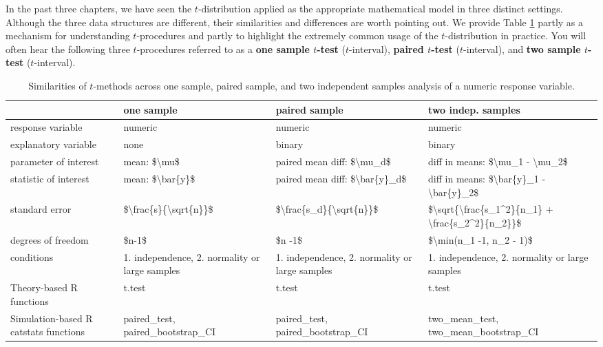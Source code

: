 \documentclass[
  10pt,
  openany]{book}
\theoremstyle{definition}
\theoremstyle{definition}
\theoremstyle{definition}
\theoremstyle{definition}
\theoremstyle{remark}
\begin{document}
In the past three chapters, we have seen the \(t\)-distribution applied as the appropriate mathematical model in three distinct settings. Although the three data structures are different, their similarities and differences are worth pointing out. We provide Table \ref{tab:tcompare} partly as a mechanism for understanding \(t\)-procedures and partly to highlight the extremely common usage of the \(t\)-distribution in practice. You will often hear the following three \(t\)-procedures referred to as a \textbf{one sample \(t\)-test} (\(t\)-interval), \textbf{paired \(t\)-test} (\(t\)-interval), and \textbf{two sample \(t\)-test} (\(t\)-interval).

\begin{table}
\centering
\caption{\label{tab:tcompare}Similarities of $t$-methods across one sample, paired sample, and two independent samples analysis of a numeric response variable.}
\centering
\begin{tabular}[t]{l|l|l|l}
\hline
 &  one sample  & paired sample & two indep. samples\\
\hline
response variable & numeric & numeric & numeric\\
\hline
explanatory variable & none & binary & binary\\
\hline
parameter of interest & mean: \$\textbackslash{}mu\$ & paired mean diff: \$\textbackslash{}mu\_d\$ & diff in means: \$\textbackslash{}mu\_1 - \textbackslash{}mu\_2\$\\
\hline
statistic of interest & mean: \$\textbackslash{}bar\{y\}\$ & paired mean diff: \$\textbackslash{}bar\{y\}\_d\$ & diff in means: \$\textbackslash{}bar\{y\}\_1 - \textbackslash{}bar\{y\}\_2\$\\
\hline
standard error & \$\textbackslash{}frac\{s\}\{\textbackslash{}sqrt\{n\}\}\$ & \$\textbackslash{}frac\{s\_d\}\{\textbackslash{}sqrt\{n\}\}\$ & \$\textbackslash{}sqrt\{\textbackslash{}frac\{s\_1\textasciicircum{}2\}\{n\_1\} + \textbackslash{}frac\{s\_2\textasciicircum{}2\}\{n\_2\}\}\$\\
\hline
degrees of freedom & \$n-1\$ & \$n -1\$ & \$\textbackslash{}min(n\_1 -1, n\_2 - 1)\$\\
\hline
conditions & 1. independence, 2. normality or large samples & 1. independence, 2. normality or large samples & 1. independence, 2. normality or large samples\\
\hline
Theory-based R functions & t.test & t.test & t.test\\
\hline
Simulation-based R catstats functions & paired\_test, paired\_bootstrap\_CI & paired\_test, paired\_bootstrap\_CI & two\_mean\_test, two\_mean\_bootstrap\_CI\\
\hline
\end{tabular}
\end{table}
\end{document}
